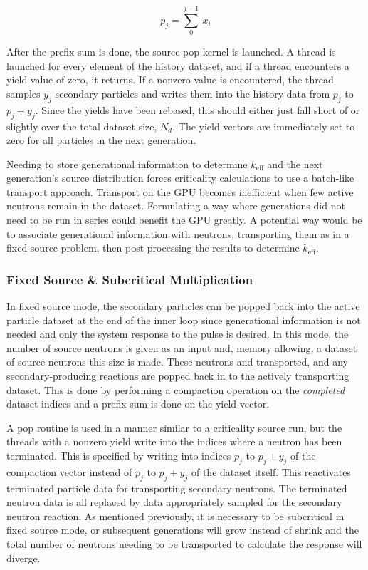 \begin{equation}
p_j = \sum_0^{j-1} \: x_i
\label{prefix_sum}
\end{equation}

After the prefix sum is done, the source pop kernel is launched.  A thread is launched for every element of the history dataset, and if a thread encounters a yield value of zero, it returns.  If a nonzero value is encountered, the thread samples $y_j$ secondary particles and writes them into the history data from $p_j$ to $p_j+y_j$.  Since the yields have been rebased, this should either just fall short of or slightly over the total dataset size, $N_d$.  The yield vectors are immediately set to zero for all particles in the next generation.

Needing to store generational information to determine $k_\mathrm{eff}$ and the next generation's source distribution forces criticality calculations to use a batch-like transport approach.  Transport on the GPU becomes inefficient when few active neutrons remain in the dataset.  Formulating a way where generations did not need to be run in series could benefit the GPU greatly.  A potential way would be to associate generational information with neutrons, transporting them as in a fixed-source problem, then post-processing the results to determine $k_\mathrm{eff}$. 

\subsubsection{Fixed Source \& Subcritical Multiplication}

In fixed source mode, the secondary particles can be popped back into the active particle dataset at the end of the inner loop since generational information is not needed and only the system response to the pulse is desired. %
 In this mode, the number of source neutrons is given as an input and, memory allowing, a dataset of source neutrons this size is made.  These neutrons and transported, and any secondary-producing reactions are popped back in to the actively transporting dataset.  This is done by performing a compaction operation on the \emph{completed} dataset indices and a prefix sum is done on the yield vector.  
 
A pop routine is used in a manner similar to a criticality source run, but the threads with a nonzero yield write into the indices where a neutron has been terminated. This is specified by writing into indices $p_j$ to $p_j+y_j$ of the compaction vector instead of $p_j$ to $p_j+y_j$ of the dataset itself.  This reactivates terminated particle data for transporting secondary neutrons.  The terminated neutron data is all replaced by data appropriately sampled for the secondary neutron reaction.  As mentioned previously, it is necessary to be subcritical in fixed source mode, or subsequent generations will grow instead of shrink and the total number of neutrons needing to be transported to calculate the response will diverge.

